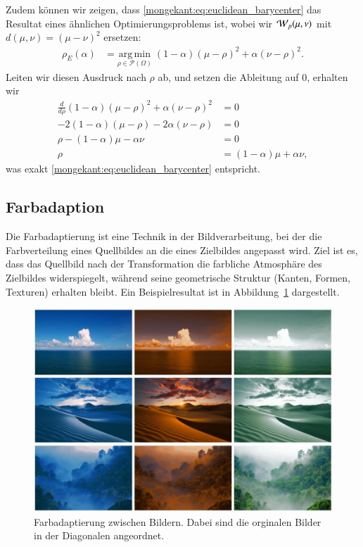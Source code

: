 Zudem können wir zeigen,
dass \eqref{mongekant:eq:euclidean_barycenter} das Resultat eines ähnlichen Optimierungsproblems ist,
wobei wir $\wasserstein(\mu, \nu)$ mit $d(\mu, \nu) = (\mu - \nu)^2$ ersetzen:
\begin{align*}
\rho_E(\alpha)
&=
\underset{\rho \in \mathcal{P}(\Omega)}{\mathrm{arg\,min}}\;
(1-\alpha) (\mu - \rho)^2
+ \alpha (\nu - \rho)^2
.
\end{align*}
Leiten wir diesen Ausdruck nach $\rho$ ab,
und setzen die Ableitung auf $0$,
erhalten wir
\begin{align*}
\frac{d}{d\rho}
(1- \alpha) (\mu - \rho)^2 + \alpha (\nu - \rho)^2
&=
0
\\
-2(1-\alpha)(\mu - \rho) - 2\alpha(\nu - \rho)
&=
0
\\
\rho - (1-\alpha)\mu - \alpha \nu
&=
0
\\
\rho
&=
(1-\alpha)\mu + \alpha \nu
,
\end{align*}
was exakt \eqref{mongekant:eq:euclidean_barycenter} entspricht.

\subsection{Farbadaption\label{mongekant:subsection:farbadaption}}

Die Farbadaptierung ist eine Technik in der Bildverarbeitung,
bei der die Farbverteilung eines Quellbildes an die eines Zielbildes angepasst wird.
Ziel ist es,
dass das Quellbild nach der Transformation
die farbliche Atmosphäre des Zielbildes widerspiegelt,
während seine geometrische Struktur (Kanten, Formen, Texturen) erhalten bleibt.
Ein Beispielresultat ist in Abbildung~\ref{mongekant:fig:adaption} dargestellt.

\begin{figure}
\centering
\includegraphics[width=\textwidth]{papers/mongekant/code/adaption}
\caption{Farbadaptierung zwischen Bildern.
Dabei sind die orginalen Bilder in der Diagonalen angeordnet.
}
\label{mongekant:fig:adaption}
\end{figure}

